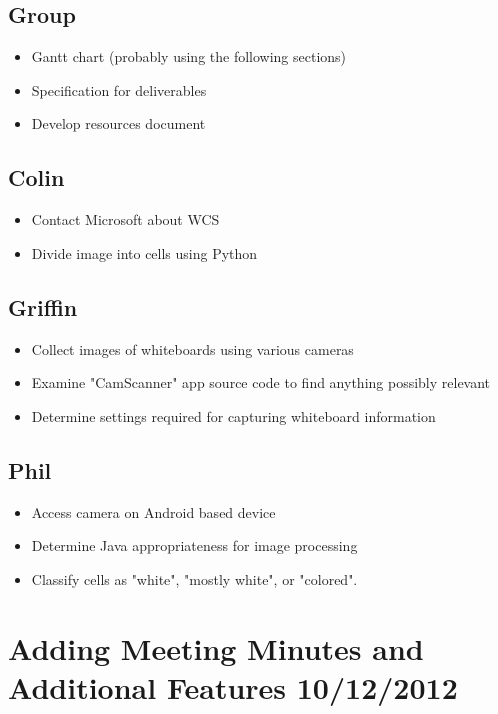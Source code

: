 \documentclass[]{article}
\begin{document}
		\subsection{Group}
			\begin{itemize}
				\item Gantt chart (probably using the following sections)
				\item Specification for deliverables
				\item Develop resources document
			\end{itemize}
	
		\subsection{Colin}
			\begin{itemize}
				\item Contact Microsoft about WCS
				\item Divide image into cells using Python
			\end{itemize}
		
		
		\subsection{Griffin}
			\begin{itemize}
				\item Collect images of whiteboards using various cameras
				\item Examine "CamScanner" app source code to find anything possibly relevant
				\item Determine settings required for capturing whiteboard information
			\end{itemize}
		
		\subsection{Phil}
			\begin{itemize}
				\item Access camera on Android based device
				\item Determine Java appropriateness for image processing
				\item Classify cells as "white", "mostly white", or "colored".
			\end{itemize}
	
	
	\section{Adding Meeting Minutes and Additional Features 10/12/2012}
		
\end{document}
